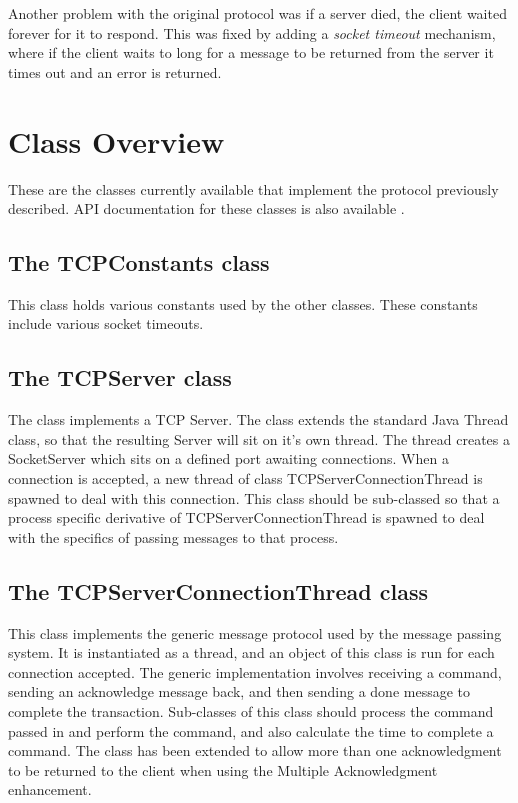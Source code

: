 \documentclass[10pt,a4paper]{article}
\begin{document}
Another problem with the original protocol was if a server died, the client waited forever for it to respond.
This was fixed by adding a {\em socket timeout} mechanism, where if the client waits to long for a message to
be returned from the server it times out and an error is returned.

\section{Class Overview}
These are the classes currently available that implement the protocol previously described. API documentation
for these classes is also available \cite{bib:ngatnettree}.

\subsection{The TCPConstants class}
This class holds various constants used by the other classes. These constants include various socket timeouts.

\subsection{The TCPServer class}
The class implements a TCP Server. The class extends the standard Java Thread class, so that the resulting Server
will sit on it's own thread. The thread creates a SocketServer which sits on a defined port awaiting connections. 
When a connection is accepted, a new thread of class TCPServerConnectionThread is spawned to deal with this connection.
This class should be sub-classed so that a process specific derivative of TCPServerConnectionThread is spawned
to deal with the specifics of passing messages to that process.

\subsection{The TCPServerConnectionThread class}
This class implements the generic message protocol used by the message passing system. It is instantiated as a thread,
and an object of this class is run for each connection accepted. The generic implementation involves receiving a 
command, sending an acknowledge message back, and then sending a done message to complete the transaction. Sub-classes
of this class should process the command passed in and perform the command, and also calculate the time to complete 
a command. The class has been extended to allow more than one acknowledgment to be returned to the client when using
the Multiple Acknowledgment enhancement.
\end{document}
